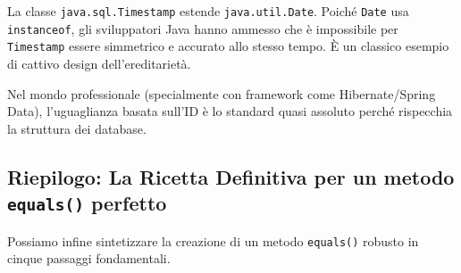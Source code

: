 \begin{observation}
    La classe \texttt{java.sql.Timestamp} estende \texttt{java.util.Date}. Poiché \texttt{Date} usa \texttt{instanceof}, gli sviluppatori Java hanno ammesso che è impossibile per \texttt{Timestamp} essere simmetrico e accurato allo stesso tempo. È un classico esempio di cattivo design dell'ereditarietà.
\end{observation}

\begin{observation}
    Nel mondo professionale (specialmente con framework come Hibernate/Spring Data), l'uguaglianza basata sull'ID è lo standard quasi assoluto perché rispecchia la struttura dei database.
\end{observation}

\subsection*{ Riepilogo: La Ricetta Definitiva per un metodo \texttt{equals()} perfetto}

Possiamo infine sintetizzare la creazione di un metodo \texttt{equals()} robusto in cinque passaggi fondamentali.

